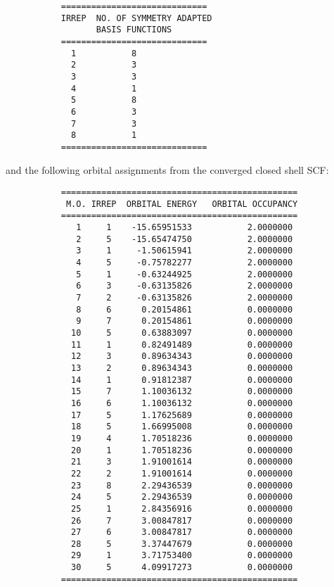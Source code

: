 \documentclass[11pt,fleqn]{article}
\begin{document}
{
\footnotesize
\begin{verbatim}
           =============================
           IRREP  NO. OF SYMMETRY ADAPTED
                  BASIS FUNCTIONS
           =============================
             1           8
             2           3
             3           3
             4           1
             5           8
             6           3
             7           3
             8           1
           =============================
\end{verbatim}
}
and the following orbital assignments from
the converged closed shell SCF:
{
\footnotesize
\begin{verbatim}
           ===============================================
            M.O. IRREP  ORBITAL ENERGY   ORBITAL OCCUPANCY
           ===============================================
              1     1    -15.65951533           2.0000000
              2     5    -15.65474750           2.0000000
              3     1     -1.50615941           2.0000000
              4     5     -0.75782277           2.0000000
              5     1     -0.63244925           2.0000000
              6     3     -0.63135826           2.0000000
              7     2     -0.63135826           2.0000000
              8     6      0.20154861           0.0000000
              9     7      0.20154861           0.0000000
             10     5      0.63883097           0.0000000
             11     1      0.82491489           0.0000000
             12     3      0.89634343           0.0000000
             13     2      0.89634343           0.0000000
             14     1      0.91812387           0.0000000
             15     7      1.10036132           0.0000000
             16     6      1.10036132           0.0000000
             17     5      1.17625689           0.0000000
             18     5      1.66995008           0.0000000
             19     4      1.70518236           0.0000000
             20     1      1.70518236           0.0000000
             21     3      1.91001614           0.0000000
             22     2      1.91001614           0.0000000
             23     8      2.29436539           0.0000000
             24     5      2.29436539           0.0000000
             25     1      2.84356916           0.0000000
             26     7      3.00847817           0.0000000
             27     6      3.00847817           0.0000000
             28     5      3.37447679           0.0000000
             29     1      3.71753400           0.0000000
             30     5      4.09917273           0.0000000
           ===============================================
\end{verbatim}
}
\end{document}
